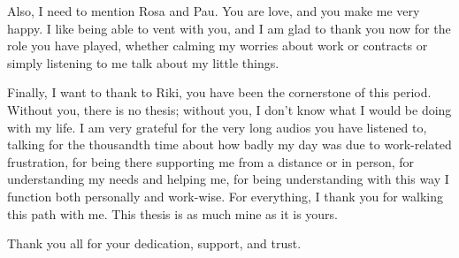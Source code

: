 Also, I need to mention Rosa and Pau. You are love, and you make me very happy. I like being able to vent with you, and I am glad to thank you now for the role you have played, whether calming my worries about work or contracts or simply listening to me talk about my little things.

\thispagestyle{empty}

Finally, I want to thank to Riki, you have been the cornerstone of this period. Without you, there is no thesis; without you, I don't know what I would be doing with my life. I am very grateful for the very long audios you have listened to, talking for the thousandth time about how badly my day was due to work-related frustration, for being there supporting me from a distance or in person, for understanding my needs and helping me, for being understanding with this way I function both personally and work-wise. For everything, I thank you for walking this path with me. This thesis is as much mine as it is yours.

Thank you all for your dedication, support, and trust.


\vfill